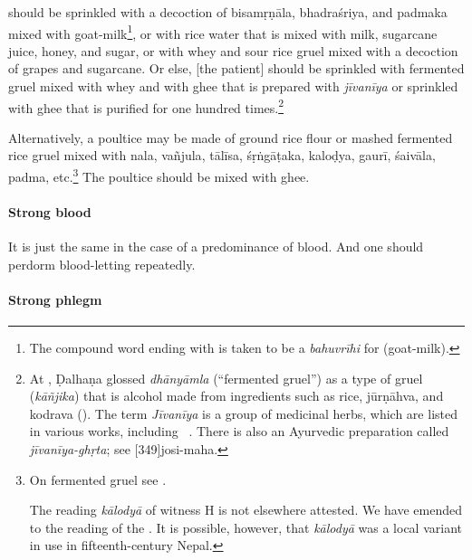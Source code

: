 \begin{translation}
 should be sprinkled with a decoction of
\gls{bisamṛṇāla}, \gls{bhadraśriya}, and \gls{padmaka} mixed with
goat-milk\footnote{The compound word ending with  is
    taken to be a \textit{bahuvrīhi} for  (goat-milk).},
    or with rice water that is mixed with milk, sugarcane juice, honey,
    and sugar, or with whey and sour rice gruel mixed with a decoction of
    grapes and sugarcane. Or else, [the patient] should be sprinkled with
    fermented gruel mixed with whey and with ghee that is prepared with
    \emph{jīvanīya} or sprinkled with ghee that is purified for one
    hundred times.\footnote{At , Ḍalhaṇa glossed
        \emph{dhānyāmla} (``fermented gruel'') as a type of gruel
        (\emph{kāñjika}) that is alcohol made from ingredients such as rice,
        \gls{jūrṇāhva}, and \gls{kodrava} (). The term \emph{Jīvanīya} is a
        group of medicinal herbs, which are listed in various works, including
        \CS\ . There is also an Ayurvedic preparation called
        \emph{jīvanīya-ghṛta}; see [349]{josi-maha}.} %

Alternatively, a poultice may
be made of ground rice flour or mashed fermented rice gruel mixed with
\gls{nala}, \gls{vañjula},
\gls{tālīsa},
\gls{śṛṅgāṭaka}, 
\gls{kaloḍya},
\gls{gaurī}, \gls{śaivāla},
\gls{padma}, etc.\footnote{On fermented  gruel see \cite[23, et passim]{mchu-2021}.

The reading \emph{kālodyā} of witness H is not elsewhere attested. We
have emended to the reading of the \citep[425]{vulgate}. It is
possible, however, that \emph{kālodyā} was a local variant in use in
fifteenth-century Nepal.} The poultice should be mixed with ghee.


\paragraph{Strong blood}    

\item[9]

It is just the same in the case of a predominance of blood. And
one should perdorm blood-letting repeatedly.


\paragraph{Strong phlegm}  


\end{translation}

